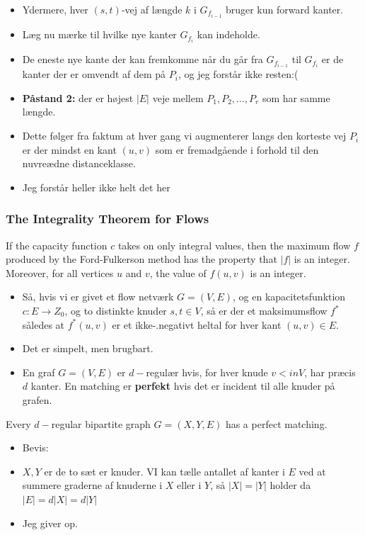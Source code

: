 \documentclass{beamer}
\begin{document}
\begin{frame}[allowframebreaks]
\begin{itemize}
\begin{itemize}
      \item Ydermere, hver $(s,t)$-vej af længde $k$ i $G_{f_{i-1}}$ bruger kun forward kanter.
      \item Læg nu mærke til hvilke nye kanter $G_{f_{i}}$ kan indeholde. 
      \item De eneste nye kante der kan fremkomme når du går fra $G_{f_{i-1}}$ til $G_{f_{i}}$ er de kanter der er omvendt af dem på $P_{i}$, og jeg forstår ikke resten:(
      \item \textbf{Påstand 2: } der er højest $|E|$ veje mellem $P_{1}, P_{2}, \ldots, P_{r}$ som har samme længde. 
      \item Dette følger fra faktum at hver gang vi augmenterer langs den korteste vej  $P_{i}$ er der mindst en kant $(u,v)$ som er fremadgående i forhold til den nuvreædne distanceklasse. 
      \item Jeg forstår heller ikke helt det her
    \end{itemize}
  \end{itemize}
\end{frame}

\begin{frame}[allowframebreaks]
  \frametitle{The Integrality Theorem for Flows}
  \begin{theorem}
If the capacity function $c$ takes on only integral values, then the maximum flow $f$ produced by the Ford-Fulkerson method has the property that $|f|$ is an integer. Moreover, for all vertices $u$ and $v$, the value of $f(u,v)$ is an integer. 
\end{theorem}
\begin{itemize}
\item Så, hvis vi er givet et flow netværk $G = (V,E)$, og en kapacitetsfunktion $c : E \rightarrow Z_{0}$, og to distinkte knuder $s, t \in V$, så er der et maksimumsflow $f^{*}$ således at $f^{*}(u,v)$ er et ikke-.negativt heltal for hver kant $(u,v) \in E$. 
\item Det er simpelt, men brugbart.
\item En graf $G = (V,E)$ er $d-$regulær hvis, for hver knude $v <in V$, har præcis $d$ kanter. En matching er \textbf{perfekt} hvis det er incident til alle knuder på grafen. 
\end{itemize}
\begin{theorem}
Every $d-$regular bipartite graph $G = (X,Y,E)$ has a perfect matching.
\end{theorem}
\begin{itemize}
\item Bevis: 
\item $X,Y$ er de to sæt er knuder. VI kan tælle antallet af kanter i $E$ ved at summere graderne af knuderne i $X$ eller i $Y$, så $|X| = |Y|$ holder da $|E| = d|X| = d|Y|$
\item Jeg giver op.
\end{itemize}
\end{frame}
\end{document}
